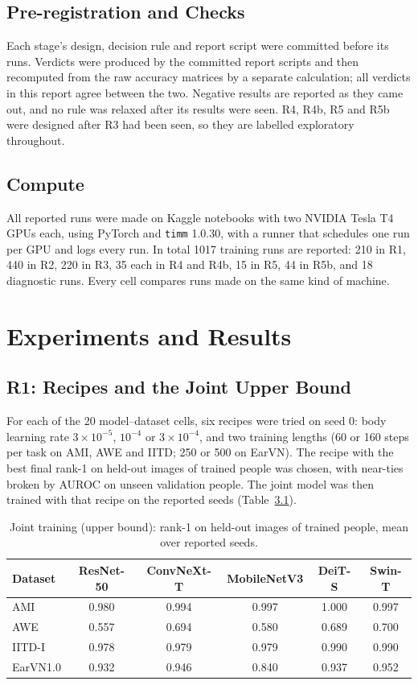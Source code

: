 \documentclass[12pt,a4paper]{report}
\begin{document}
\section{Pre-registration and Checks}
Each stage's design, decision rule and report script were committed before its runs. Verdicts were produced by the committed report scripts and then recomputed from the raw accuracy matrices by a separate calculation; all verdicts in this report agree between the two. Negative results are reported as they came out, and no rule was relaxed after its results were seen. R4, R4b, R5 and R5b were designed after R3 had been seen, so they are labelled exploratory throughout.

\section{Compute}
All reported runs were made on Kaggle notebooks with two NVIDIA Tesla T4 GPUs each, using PyTorch and \texttt{timm} 1.0.30, with a runner that schedules one run per GPU and logs every run. In total 1017 training runs are reported: 210 in R1, 440 in R2, 220 in R3, 35 each in R4 and R4b, 15 in R5, 44 in R5b, and 18 diagnostic runs. Every cell compares runs made on the same kind of machine.

\chapter{Experiments and Results}\label{ch:results}

\section{R1: Recipes and the Joint Upper Bound}
For each of the 20 model--dataset cells, six recipes were tried on seed 0: body learning rate $3\times10^{-5}$, $10^{-4}$ or $3\times10^{-4}$, and two training lengths (60 or 160 steps per task on AMI, AWE and IITD; 250 or 500 on EarVN). The recipe with the best final rank-1 on held-out images of trained people was chosen, with near-ties broken by AUROC on unseen validation people. The joint model was then trained with that recipe on the reported seeds (Table~\ref{tab:joint}).

\begin{table}[H]
\centering
\small
\caption{Joint training (upper bound): rank-1 on held-out images of trained people, mean over reported seeds.}
\label{tab:joint}
\begin{tabular}{|l|c|c|c|c|c|}
\hline
\textbf{Dataset} & \textbf{ResNet-50} & \textbf{ConvNeXt-T} & \textbf{MobileNetV3} & \textbf{DeiT-S} & \textbf{Swin-T} \\
\hline
AMI & 0.980 & 0.994 & 0.997 & 1.000 & 0.997 \\
AWE & 0.557 & 0.694 & 0.580 & 0.689 & 0.700 \\
IITD-I & 0.978 & 0.979 & 0.979 & 0.990 & 0.990 \\
EarVN1.0 & 0.932 & 0.946 & 0.840 & 0.937 & 0.952 \\
\hline
\end{tabular}
\end{table}
\end{document}
